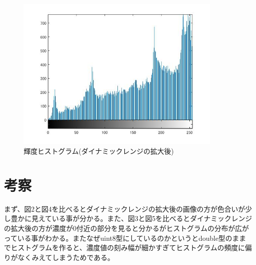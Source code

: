 \documentclass{jsarticle}
\begin{document}
\newpage
\begin{figure}[htbp]
 \begin{center}
  \includegraphics[width=10cm]{kadai7-3.jpg}
 \end{center}
 \caption{輝度ヒストグラム(ダイナミックレンジの拡大後)}
\end{figure}

\section{考察}
まず、図2と図4を比べるとダイナミックレンジの拡大後の画像の方が色合いが少し豊かに見えている事が分かる。また、図3と図5を比べるとダイナミックレンジの拡大後の方が濃度が0付近の部分を見ると分かるがヒストグラムの分布が広がっている事がわかる。またなぜuint8型にしているのかというとdouble型のままでヒストグラムを作ると、濃度値の刻み幅が細かすぎてヒストグラムの頻度に偏りがなくみえてしまうためである。
\end{document}
